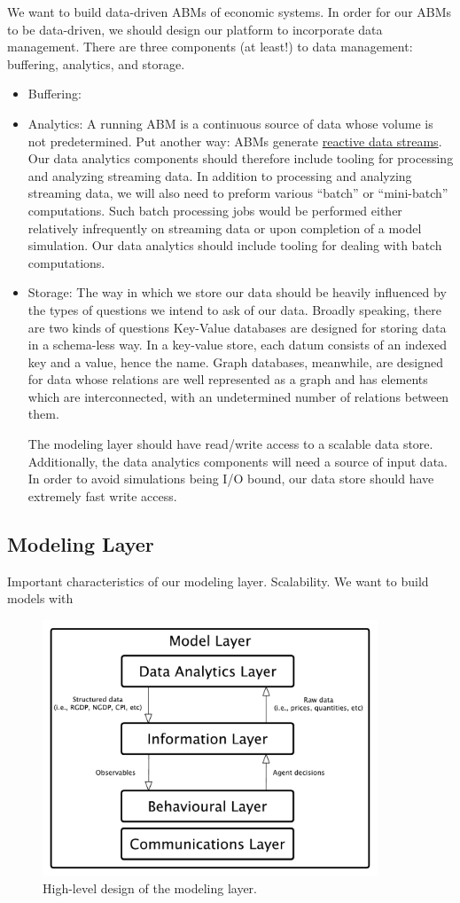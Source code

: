 \documentclass[11pt]{amsart}
\begin{document}
We want to build data-driven ABMs of economic systems. In order for our ABMs to be data-driven, we should design our platform to incorporate data management. There are three components (at least!) to data management: buffering, analytics, and storage.
\begin{itemize}
    \item Buffering:
    \item Analytics: A running ABM is a continuous source of data whose volume is not predetermined. Put another way: ABMs generate \href{http://www.reactive-streams.org/}{reactive data streams}.  Our data analytics components should therefore include tooling for processing and analyzing streaming data. In addition to processing and analyzing streaming data, we will also need to preform various ``batch'' or ``mini-batch'' computations. Such batch processing jobs would be performed either relatively infrequently on streaming data or upon completion of a model simulation. Our data analytics should include tooling for dealing with batch computations.
    \item Storage: The way in which we store our data should be heavily influenced by the types of questions we intend to ask of our data.  Broadly speaking, there are two kinds of questions Key-Value databases are designed for storing data in a schema-less way. In a key-value store, each datum consists of an indexed key and a value, hence the name.  Graph databases, meanwhile, are designed for data whose relations are well represented as a graph and has elements which are interconnected, with an undetermined number of relations between them.

    The modeling layer should have read/write access to a scalable data store. Additionally, the data analytics components will need a source of input data. In order to avoid simulations being I/O bound, our data store should have extremely fast write access.
\end{itemize}

\subsection{Modeling Layer}
Important characteristics of our modeling layer.  Scalability. We want to build models with 
\begin{figure}[H]
\centering
\includegraphics[width=10cm]{img/coarse-grain-model-layer.pdf}
\caption{High-level design of the modeling layer.}
\end{figure}
\end{document}
